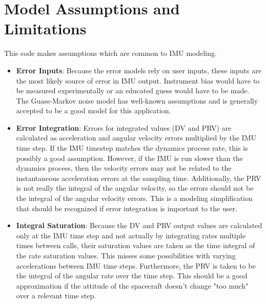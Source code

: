 \section{Model Assumptions and Limitations}
This code makes assumptions which are common to IMU modeling.
\begin{itemize}
	\item \textbf{Error Inputs}: Because the error models rely on user inputs, these inputs are the most likely source of error in IMU output. Instrument bias would have to be measured experimentally or an educated guess would have to be made. The Guass-Markov noise model has well-known assumptions and is generally accepted to be a good model for this application.
	\item \textbf{Error Integration}: Errors for integrated values (DV and PRV) are calculated as acceleration and angular velocity errors multiplied by the IMU time step.  If the IMU timestep matches the dynamics process rate, this is possibly a good assumption. However, if the IMU is run slower than the dynamics process, then the velocity errors may not be related to the instantaneous acceleration errors at the sampling time.
	Additionally, the PRV is not really the integral of the angular velocity, so the errors should not be the integral of the angular velocity errors. This is a modeling simplification that should be recognized if error integration is important to the user.
	\item \textbf{Integral Saturation}: Because the DV and PRV output values are calculated only at the IMU time step and not actually by integrating rates multiple times between calls, their saturation values are taken as the time integral of the rate saturation values. This misses some possibilities with varying accelerations between IMU time steps. Furthermore, the PRV is taken to be the integral of the angular rate over the time step. This should be a good approximation if the attitude of the spacecraft doesn't change "too much" over a relevant time step.
\end{itemize}